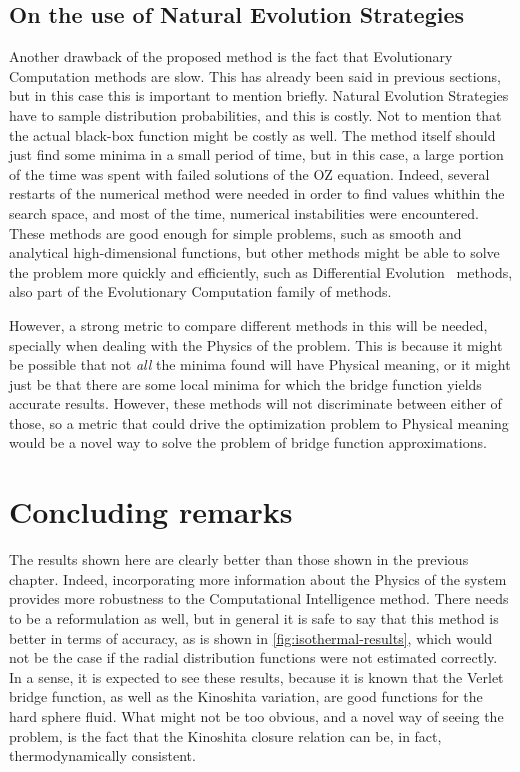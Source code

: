 \subsection{On the use of Natural Evolution Strategies}
Another drawback of the proposed method is the fact that Evolutionary Computation methods 
are slow. This has already been said in previous sections, but in this case this is 
important to mention briefly. Natural Evolution Strategies have to sample distribution 
probabilities, and this is costly. Not to mention that the actual black-box function might 
be costly as well. The method itself should just find some minima in a small period of 
time, but in this case, a large portion of the time was spent with failed solutions of the 
OZ equation. Indeed, several restarts of the numerical method were 
needed in order to find values whithin the search space, and most of the time, numerical 
instabilities were encountered. These methods are good enough for simple problems, such as 
smooth and analytical high-dimensional functions, but other methods might be able to solve 
the problem more quickly and efficiently, such as Differential 
Evolution~\cite{dasDifferentialEvolutionSurvey2011} methods, also part of the 
Evolutionary Computation family of methods.

However, a strong metric to compare different methods in this will be needed, specially 
when dealing with the Physics of the problem. This is because it might be possible that not 
\emph{all} the minima found will have Physical meaning, or it might just be that there are 
some local minima for which the bridge function yields accurate results. However, these 
methods will not discriminate between either of those, so a metric that could drive the 
optimization problem to Physical meaning would be a novel way to solve the problem of 
bridge function approximations.

\section{Concluding remarks}
The results shown here are clearly better than those shown in the previous chapter. Indeed, 
incorporating more information about the Physics of the system provides more robustness to 
the Computational Intelligence method. There needs to be a reformulation as well, but in 
general it is safe to say that this method is better in terms of accuracy, as is shown in
\autoref{fig:isothermal-results}, which would not be the case if the radial distribution 
functions were not estimated correctly.
In a sense, it is expected to see these results, because it is known that the Verlet bridge 
function, as well as the Kinoshita variation, are good functions for the hard sphere fluid.
What might not be too obvious, and a novel way of seeing the problem, is the fact that the
Kinoshita closure relation can be, in fact, thermodynamically consistent.

